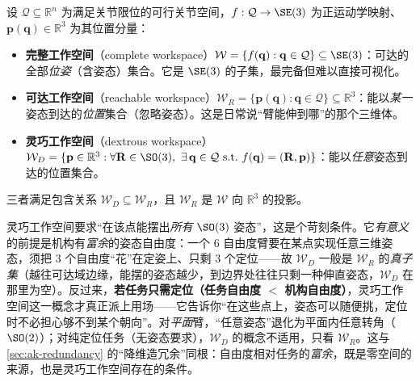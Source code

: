 \begin{definition}[三层工作空间]\label{def:ak-workspace}
设 $\mathcal{Q}\subseteq\mathbb{R}^n$ 为满足关节限位的可行关节空间，$f:\mathcal{Q}\to\SE(3)$ 为正运动学映射、$\mathbf{p}(\mathbf{q})\in\mathbb{R}^3$ 为其位置分量\cite{murray1994mathematical}：
\begin{itemize}
  \item \textbf{完整工作空间}（complete workspace）$\mathcal{W}=\{f(\mathbf{q}):\mathbf{q}\in\mathcal{Q}\}\subseteq\SE(3)$：可达的全部\emph{位姿}（含姿态）集合。它是 $\SE(3)$ 的子集，最完备但难以直接可视化。
  \item \textbf{可达工作空间}（reachable workspace）$\mathcal{W}_R=\{\mathbf{p}(\mathbf{q}):\mathbf{q}\in\mathcal{Q}\}\subseteq\mathbb{R}^3$：能以\emph{某一}姿态到达的\emph{位置}集合（忽略姿态）。这是日常说“臂能伸到哪”的那个三维体。
  \item \textbf{灵巧工作空间}（dextrous workspace）$\mathcal{W}_D=\{\mathbf{p}\in\mathbb{R}^3:\forall\mathbf{R}\in\SO(3),\ \exists\,\mathbf{q}\in\mathcal{Q}\ \text{s.t.}\ f(\mathbf{q})=(\mathbf{R},\mathbf{p})\}$：能以\emph{任意}姿态到达的位置集合。
\end{itemize}
三者满足包含关系 $\mathcal{W}_D\subseteq\mathcal{W}_R$，且 $\mathcal{W}_R$ 是 $\mathcal{W}$ 向 $\mathbb{R}^3$ 的投影。
\end{definition}

\begin{insight}\label{ins:ak-ws-dextrous-cond}
灵巧工作空间要求“在该点能摆出\emph{所有} $\SO(3)$ 姿态”，这是个苛刻条件。它\emph{有意义}的前提是机构有\emph{富余}的姿态自由度\cite{murray1994mathematical}：一个 6 自由度臂要在某点实现任意三维姿态，须把 3 个自由度“花”在定姿上、只剩 3 个定位——故 $\mathcal{W}_D$ 一般是 $\mathcal{W}_R$ 的\emph{真子集}（越往可达域边缘，能摆的姿态越少，到边界处往往只剩一种伸直姿态，$\mathcal{W}_D$ 在那里为空）。反过来，\textbf{若任务只需定位（任务自由度 $<$ 机构自由度）}，灵巧工作空间这一概念才真正派上用场——它告诉你“在这些点上，姿态可以随便挑，定位时不必担心够不到某个朝向”。对\emph{平面}臂，“任意姿态”退化为平面内任意转角（$\SO(2)$）；对纯定位任务（无姿态要求），$\mathcal{W}_D$ 的概念不适用，只看 $\mathcal{W}_R$。这与 \cref{sec:ak-redundancy} 的“降维造冗余”同根：自由度相对任务的\emph{富余}，既是零空间的来源，也是灵巧工作空间存在的条件。
\end{insight}

